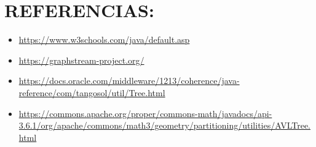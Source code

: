 \documentclass{article}
\begin{document}
        \section{REFERENCIAS:}
            \begin{itemize}			
                \item \url{https://www.w3schools.com/java/default.asp}
                \item \url{https://graphstream-project.org/}
                \item \url{https://docs.oracle.com/middleware/1213/coherence/java-reference/com/tangosol/util/Tree.html}
                \item \url{https://commons.apache.org/proper/commons-math/javadocs/api-3.6.1/org/apache/commons/math3/geometry/partitioning/utilities/AVLTree.html}
            \end{itemize}	
        	
        			
\end{document}
